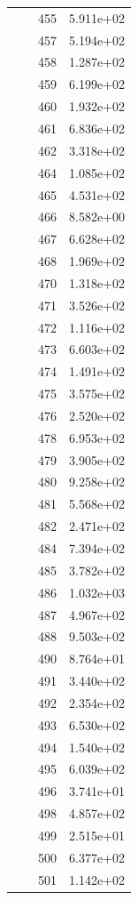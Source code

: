 \documentclass[12pt]{article}
\begin{document}
\begin{longtable}{@{}cccc@{}}
 &  & 455 & 5.911e+02 \\
 &  & 457 & 5.194e+02 \\
 &  & 458 & 1.287e+02 \\
 &  & 459 & 6.199e+02 \\
 &  & 460 & 1.932e+02 \\
 &  & 461 & 6.836e+02 \\
 &  & 462 & 3.318e+02 \\
 &  & 464 & 1.085e+02 \\
 &  & 465 & 4.531e+02 \\
 &  & 466 & 8.582e+00 \\
 &  & 467 & 6.628e+02 \\
 &  & 468 & 1.969e+02 \\
 &  & 470 & 1.318e+02 \\
 &  & 471 & 3.526e+02 \\
 &  & 472 & 1.116e+02 \\
 &  & 473 & 6.603e+02 \\
 &  & 474 & 1.491e+02 \\
 &  & 475 & 3.575e+02 \\
 &  & 476 & 2.520e+02 \\
 &  & 478 & 6.953e+02 \\
 &  & 479 & 3.905e+02 \\
 &  & 480 & 9.258e+02 \\
 &  & 481 & 5.568e+02 \\
 &  & 482 & 2.471e+02 \\
 &  & 484 & 7.394e+02 \\
 &  & 485 & 3.782e+02 \\
 &  & 486 & 1.032e+03 \\
 &  & 487 & 4.967e+02 \\
 &  & 488 & 9.503e+02 \\
 &  & 490 & 8.764e+01 \\
 &  & 491 & 3.440e+02 \\
 &  & 492 & 2.354e+02 \\
 &  & 493 & 6.530e+02 \\
 &  & 494 & 1.540e+02 \\
 &  & 495 & 6.039e+02 \\
 &  & 496 & 3.741e+01 \\
 &  & 498 & 4.857e+02 \\
 &  & 499 & 2.515e+01 \\
 &  & 500 & 6.377e+02 \\
 &  & 501 & 1.142e+02 \\

\end{longtable}
\end{document}
